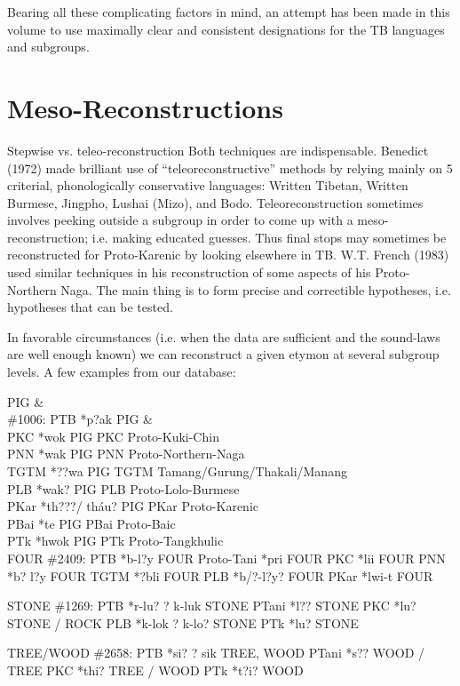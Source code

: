 Bearing all these complicating factors in mind, an attempt has been made in
this volume to use maximally clear and consistent designations for the TB
languages and subgroups.


\section{Meso-Reconstructions}

Stepwise vs. teleo-reconstruction
Both techniques are indispensable. Benedict (1972) made brilliant use of “teleoreconstructive” methods by relying mainly on 5 criterial, phonologically conservative languages: Written Tibetan, Written Burmese, Jingpho, Lushai (Mizo), and Bodo. Teleoreconstruction sometimes involves peeking outside a subgroup in order to come up with a meso-reconstruction; i.e. making educated guesses. Thus final stops may sometimes be reconstructed for Proto-Karenic by looking elsewhere in TB. W.T. French (1983) used similar techniques in his reconstruction of some aspects of his Proto-Northern Naga. The main thing is to form precise and correctible hypotheses, i.e. hypotheses that can be tested.

In favorable circumstances (i.e. when the data are sufficient and the sound-laws are well enough known) we can reconstruct a given etymon at several subgroup levels. A few examples from our database: 

PIG \& \\
\#1006: PTB *p?ak PIG \& \\
PKC *wok PIG	PKC	Proto-Kuki-Chin \\
PNN *wak PIG 	PNN	Proto-Northern-Naga\\
TGTM *??wa PIG 	TGTM	Tamang/Gurung/Thakali/Manang\\
PLB *wak? PIG 	PLB	Proto-Lolo-Burmese\\
PKar *th???/ tháu?  PIG	PKar	Proto-Karenic\\
PBai *te PIG 	PBai	Proto-Baic\\
PTk *hwok PIG	  PTk	Proto-Tangkhulic\\

FOUR
\#2409: PTB *b-l?y FOUR
Proto-Tani *pri FOUR
PKC *lii FOUR
PNN *b? l?y FOUR
TGTM *?bli FOUR
PLB *b/?-l?y? FOUR
PKar *lwi-t FOUR

STONE
\#1269: PTB *r-lu? ? k-luk STONE
PTani *l?? STONE
PKC *lu? STONE / ROCK
PLB *k-lok ? k-lo? STONE
PTk *lu? STONE

TREE/WOOD
\#2658: PTB *si? ? sik TREE, WOOD
PTani *s?? WOOD / TREE
PKC *thi? TREE / WOOD
PTk *t?i? WOOD

